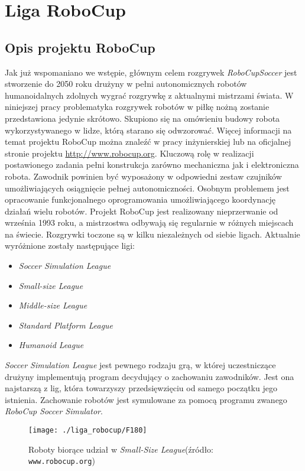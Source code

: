 \chapter{Liga RoboCup \label{chap:robocup}}
\section{Opis projektu RoboCup \label{sec:opis_robocup}}
	Jak już wspomaniano we wstępie, głównym celem rozgrywek \emph{RoboCupSoccer} jest stworzenie do 2050 roku drużyny w pełni autonomicznych robotów humanoidalnych zdolnych wygrać rozgrywkę z aktualnymi mistrzami 
	świata.
	W niniejszej pracy problematyka rozgrywek robotów w piłkę nożną zostanie przedstawiona jedynie skrótowo. Skupiono się na omówieniu
	budowy robota wykorzystywanego w lidze, którą starano się odwzorować. Więcej informacji na temat projektu RoboCup można znaleźć w pracy inżynierskiej \cite{inzynierka} lub 
	na oficjalnej stronie projektu \mbox{\url{http://www.robocup.org}}.
	Kluczową rolę w realizacji postawionego zadania pełni konstrukcja zarówno mechaniczna jak i elektroniczna
	robota. Zawodnik powinien być wyposażony w odpowiedni zestaw czujników umożliwiających osiągnięcie pełnej autonomiczności. 
	Osobnym problemem jest opracowanie funkcjonalnego oprogramowania umożliwiającego koordynację działań wielu robotów.
	Projekt RoboCup jest realizowany nieprzerwanie od września 1993 roku, a mistrzostwa odbywają się regularnie w różnych miejscach na świecie.
	Rozgrywki toczone są w kilku niezależnych od siebie ligach. Aktualnie wyróżnione zostały następujące ligi:
	\begin{itemize}
	\item \emph{Soccer Simulation League}
	\item \emph{Small-size League}
	\item \emph{Middle-size League}
	\item \emph{Standard Platform League }
	\item \emph{Humanoid League}
	\end{itemize}
	
	\emph{Soccer Simulation League} jest pewnego rodzaju grą, w której uczestniczące drużyny implementują program decydujący o zachowaniu zawodników.
	Jest ona najstarszą z lig, która towarzyszy przedsięwzięciu od samego początku jego istnienia.
	Zachowanie robotów jest symulowane za pomocą programu zwanego \emph{RoboCup Soccer Simulator}.
	\begin{figure}[b]
	\centering
	\texttt{[image: ./liga\_robocup/F180]}
	\caption{ Roboty biorące udział w \emph{Small-Size League}\newline(źródło: \texttt{www.robocup.org})} \label{fig:F180}
	\end{figure}
	

